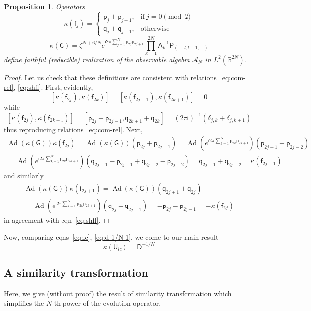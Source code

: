 \documentclass[a4paper,draft]{amsart}
\newtheorem{proposition}{Proposition}
\theoremstyle{definition}
\theoremstyle{remark}
\DeclareMathOperator{\Ad}{Ad}
\newcommand{\DEHN}{\mathsf D}
\newcommand{\GEN}{\mathsf f}
\newcommand{\IMUN}{\mathsf i}
\newcommand{\INCL}{\kappa}
\newcommand{\LC}{\mathsf U_{lc}}
\newcommand{\MOM}{\mathsf p}
\newcommand{\OBALG}{\mathcal A_{N}}
\newcommand{\PERMUTE}{\mathsf P}
\newcommand{\POS}{\mathsf q}
\newcommand{\REALS}{\mathbb R}
\newcommand{\ROTATE}{\mathsf A}
\newcommand{\SHFL}{\mathsf G}
\begin{document}
\begin{proposition}
Operators
\begin{equation}\label{eq:rfj}
\INCL(\GEN_j)=\left\{
\begin{array}{cl}
\MOM_j+\MOM_{j-1},&\mathrm{if}\ j=0\pmod2\\
\POS_j+\POS_{j-1},&\mathrm{otherwise}
\end{array}\right.
\end{equation}
\begin{equation}\label{eq:revol}
\INCL(\SHFL)=\zeta^{N+6/N}e^{\IMUN2\pi\sum_{j=1}^N\MOM_{2j}\MOM_{2j+1}}
\prod_{k=1}^{2N}\ROTATE_k^{-1}
\PERMUTE_{(\ldots,l,{l-1},\ldots)}
\end{equation}
define faithful (reducible) realization of the 
observable algebra $\OBALG$  in $L^2(\REALS^{2N})$.
\end{proposition}
\begin{proof}
Let us check that these definitions are consistent with
relations~\eqref{eq:com-rel}, \eqref{eq:shfl}. First, evidently,
\[
[\INCL(\GEN_{2j}),\INCL(\GEN_{2k})]=[\INCL(\GEN_{2j+1}),
\INCL(\GEN_{2k+1})]=0
\]
while
\[
[\INCL(\GEN_{2j}),\INCL(\GEN_{2k+1})]=[\MOM_{2j}+\MOM_{2j-1},
\POS_{2k+1}+\POS_{2k}]=(2\pi\IMUN)^{-1}(\delta_{j,k}+\delta_{j,k+1}) 
\]
thus reproducing relations~\eqref{eq:com-rel}. Next, 
\begin{multline*}
\Ad(\INCL(\SHFL))\INCL(\GEN_{2j})=\Ad(\INCL(\SHFL))
(\MOM_{2j}+\MOM_{2j-1})=\Ad(e^{\IMUN
  2\pi\sum_{k=1}^N\MOM_{2k}\MOM_{2k+1}})(\MOM_{\check{2j-1}}
+\MOM_{\check{2j-2}})\\
=\Ad(e^{\IMUN
  2\pi\sum_{k=1}^N\MOM_{2k}\MOM_{2k+1}})(\POS_{2j-1}-\MOM_{2j-1}
+\POS_{2j-2}-\MOM_{2j-2})=\POS_{2j-1}+\POS_{2j-2}=\INCL(\GEN_{2j-1})
\end{multline*}
and similarly
\begin{multline*}
\Ad(\INCL(\SHFL))\INCL(\GEN_{2j+1})=\Ad(\INCL(\SHFL))
(\POS_{2j+1}+\POS_{2j})\\=\Ad(e^{\IMUN
  2\pi\sum_{k=1}^N\MOM_{2k}\MOM_{2k+1}})(\POS_{\check{2j}}
+\POS_{\check{2j-1}})
=-\MOM_{2j}-\MOM_{2j-1}=-\INCL(\GEN_{2j})
\end{multline*}
in agreement with eqn~\eqref{eq:shfl}.
\end{proof}
Now, comparing eqns~\eqref{eq:lc}, \eqref{eq:d-1/N-1}, we come to our
main result
\begin{equation}\label{eq:u-d}
\INCL(\LC)=\DEHN^{-1/N}
\end{equation}
\subsection{A similarity transformation}
Here, we give (without proof) the result of similarity transformation which 
simplifies the $N$-th power of the evolution operator.
\end{document}
